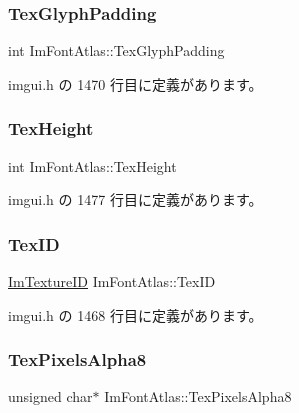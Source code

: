 \subsubsection{\texorpdfstring{Tex\+Glyph\+Padding}{TexGlyphPadding}}
{\footnotesize\ttfamily int Im\+Font\+Atlas\+::\+Tex\+Glyph\+Padding}



 imgui.\+h の 1470 行目に定義があります。

\mbox{\label{struct_im_font_atlas_a5ef74d37ec01d9e8aac5c57433296ce3}} 
\subsubsection{\texorpdfstring{Tex\+Height}{TexHeight}}
{\footnotesize\ttfamily int Im\+Font\+Atlas\+::\+Tex\+Height}



 imgui.\+h の 1477 行目に定義があります。

\mbox{\label{struct_im_font_atlas_a1d7be9a6190c75706f80bda16c87f28e}} 
\subsubsection{\texorpdfstring{Tex\+ID}{TexID}}
{\footnotesize\ttfamily \mbox{\hyperlink{imgui_8h_a364f4447ecbc4ca176145ccff9db6286}{Im\+Texture\+ID}} Im\+Font\+Atlas\+::\+Tex\+ID}



 imgui.\+h の 1468 行目に定義があります。

\mbox{\label{struct_im_font_atlas_a443ea9e7c4cf85ee791ffe891280eff3}} 
\subsubsection{\texorpdfstring{Tex\+Pixels\+Alpha8}{TexPixelsAlpha8}}
{\footnotesize\ttfamily unsigned char$\ast$ Im\+Font\+Atlas\+::\+Tex\+Pixels\+Alpha8}



